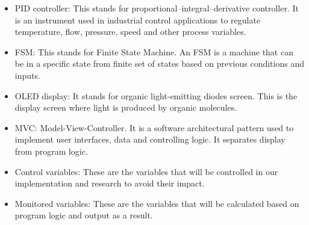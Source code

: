 \documentclass[12pt]{article}
\begin{document}
\begin{itemize}

  \item PID controller: This stands for proportional–integral–derivative controller. It is an instrument used in industrial control applications to regulate temperature, flow, pressure, speed and other process variables.
  \item FSM: This stands for Finite State Machine. An FSM is a machine that can be in a specific state from finite set of states based on previous conditions and inputs.
  \item OLED display: It stands for organic light-emitting diodes screen. This is the display screen where light is produced by organic molecules.
  \item MVC: Model-View-Controller. It is a software architectural pattern used to implement user interfaces, data and controlling logic. It separates display from program logic.
  \item Control variables: These are the variables that will be controlled in our implementation and research to avoid their impact.
  \item Monitored variables: These are the variables that will be calculated based on program logic and output as a result.

\end{itemize}
\end{document}
